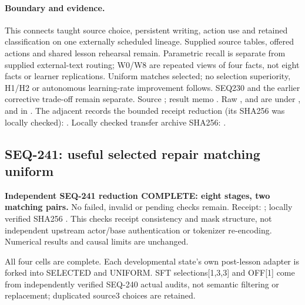 \documentclass{article}
\begin{document}
\paragraph{Boundary and evidence.}
This connects taught source choice, persistent writing, action use and retained
classification on one externally scheduled lineage. Supplied source tables,
offered actions and shared lesson rehearsal remain. Parametric recall is
separate from supplied external-text routing; W0/W8 are repeated views of four
facts, not eight facts or learner replications. Uniform matches selected;
no selection superiority, H1/H2 or autonomous learning-rate improvement follows.
SEQ230 and the earlier corrective trade-off remain separate.
Source ; result memo
.
Raw ,  and 
are under ,  and  in
.
The adjacent  records the
bounded receipt reduction (its SHA256 was locally checked):
.
Locally checked transfer archive SHA256:
.

\subsection{SEQ-241: useful selected repair matching uniform}
\label{sec:selected-reader-repair}

\textbf{Independent SEQ-241 reduction COMPLETE: eight stages, two matching pairs.}
No failed, invalid or pending checks remain. Receipt:
; locally verified SHA256
.
This checks receipt consistency and mask structure, not independent upstream
actor/base authentication or tokenizer re-encoding. Numerical results and
causal limits are unchanged.

All four cells are complete. Each developmental state's own post-lesson adapter
is forked into SELECTED and UNIFORM. SFT selections[1,3,3] and OFF[1] come from
independently verified SEQ-240 actual audits, not semantic filtering or
replacement; duplicated source3 choices are retained.
\end{document}
